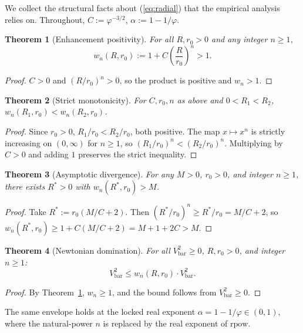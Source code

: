 \documentclass[11pt,a4paper]{article}
\theoremstyle{plain}
\newtheorem{theorem}{Theorem}
\theoremstyle{definition}
\begin{document}
We collect the structural facts about (\ref{eq:radial}) that the empirical analysis relies on. Throughout, $C := \varphi^{-3/2}$, $\alpha := 1 - 1/\varphi$.

\begin{theorem}[Enhancement positivity]
\label{thm:wpos}
For all $R, r_0 > 0$ and any integer $n \geq 1$,
\[
w_n(R, r_0) := 1 + C \left(\frac{R}{r_0}\right)^{n} > 1.
\]
\end{theorem}

\begin{proof}
$C > 0$ and $(R/r_0)^n > 0$, so the product is positive and $w_n > 1$.
\end{proof}

\begin{theorem}[Strict monotonicity]
\label{thm:wmono}
For $C, r_0, n$ as above and $0 < R_1 < R_2$, $w_n(R_1, r_0) < w_n(R_2, r_0)$.
\end{theorem}

\begin{proof}
Since $r_0 > 0$, $R_1/r_0 < R_2/r_0$, both positive. The map $x \mapsto x^n$ is strictly increasing on $(0,\infty)$ for $n \geq 1$, so $(R_1/r_0)^n < (R_2/r_0)^n$. Multiplying by $C > 0$ and adding $1$ preserves the strict inequality.
\end{proof}

\begin{theorem}[Asymptotic divergence]
\label{thm:wunbounded}
For any $M > 0$, $r_0 > 0$, and integer $n \geq 1$, there exists $R^{*} > 0$ with $w_n(R^*, r_0) > M$.
\end{theorem}

\begin{proof}
Take $R^* := r_0 (M/C + 2)$. Then $(R^*/r_0)^n \geq R^*/r_0 = M/C + 2$, so $w_n(R^*, r_0) \geq 1 + C(M/C + 2) = M + 1 + 2C > M$.
\end{proof}

\begin{theorem}[Newtonian domination]
\label{thm:newt}
For all $V_{\mathrm{bar}}^2 \geq 0$, $R, r_0 > 0$, and integer $n \geq 1$:
\[
V_{\mathrm{bar}}^{2} \le w_n(R, r_0) \cdot V_{\mathrm{bar}}^{2}.
\]
\end{theorem}

\begin{proof}
By Theorem~\ref{thm:wpos}, $w_n \geq 1$, and the bound follows from $V_{\mathrm{bar}}^2 \geq 0$.
\end{proof}

The same envelope holds at the locked real exponent $\alpha = 1 - 1/\varphi \in (0,1)$, where the natural-power $n$ is replaced by the real exponent of $\mathrm{rpow}$.
\end{document}
